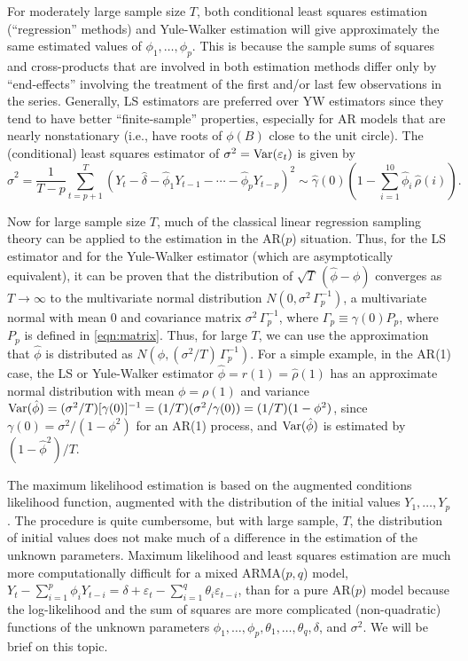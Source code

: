 For moderately large sample size $T$, both conditional least squares estimation (``regression'' methods) and Yule-Walker estimation will give approximately the same estimated values of $\phi_1, \ldots, \phi_p$. This is because the sample sums of squares and cross-products that are involved in both estimation methods differ only by ``end-effects'' involving the treatment of the first and/or last few observations in the series. Generally, LS estimators are preferred over YW estimators since they tend to have better ``finite-sample'' properties, especially for AR models that are nearly nonstationary (i.e., have roots of $\phi(B)$ close to the unit circle). The (conditional) least squares estimator of $\sigma^2 = \operatorname{Var}(\varepsilon_t)$ is given by
	\[
	\hat{\sigma}^2 =  \frac{1}{T - p}\sum_{t=p+1}^T (Y_t - \hat{\delta} - \hat{\phi}_1Y_{t-1} - \cdots - \hat{\phi}_pY_{t-p})^2 \sim \hat{\gamma}(0) \left( 1 - \sum_{i=1}^{10} \hat{\phi}_i \, \hat{\rho}(i) \right).
	\]


Now for large sample size $T$, much of the classical linear regression sampling theory can be applied to the estimation in the AR($p$) situation. Thus, for the LS estimator and for the Yule-Walker estimator (which are asymptotically equivalent), it can be proven that the distribution of $\sqrt{T}\,(\hat{\phi} - \phi)$ converges as $T \to \infty$ to the multivariate normal distribution $N(0,\sigma^2\,\Gamma_p^{-1})$, a multivariate normal with mean 0 and covariance matrix $\sigma^2\,\Gamma_p^{-1}$, where $\Gamma_p \equiv \gamma(0)P_p$, where $P_p$ is defined in \eqref{eqn:matrix}. Thus, for large $T$, we can use the approximation that $\hat{\phi}$ is distributed as $N(\phi,(\sigma^2/T)\,\Gamma_p^{-1})$. For a simple example, in the AR(1) case, the LS or Yule-Walker estimator $\hat{\phi} = r(1) = \hat{\rho}(1)$ has an approximate normal distribution with mean $\phi = \rho(1)$ and variance $\operatorname{Var}(\hat{\phi}) = (\sigma^2/T)[\gamma(0)]^{-1} = (1/T)(\sigma^2/\gamma(0)) = (1/T)(1 - \phi^2)$, since $\gamma(0) = \sigma^2/(1 - \phi^2)$ for an AR(1) process, and $\operatorname{Var}(\hat{\phi})$ is estimated by $(1 - \hat{\phi}^2)/T$.


The maximum likelihood estimation is based on the augmented conditions likelihood function, augmented with the distribution of the initial values $Y_1, \ldots, Y_p$. The procedure is quite cumbersome, but with large sample, $T$, the distribution of initial values does not make much of a difference in the estimation of the unknown parameters. Maximum likelihood and least squares estimation are much more computationally difficult for a mixed ARMA($p,q$) model, $Y_t - \sum_{i=1}^p \phi_i Y_{t-i} = \delta + \varepsilon_t - \sum_{i=1}^q\theta_i\varepsilon_{t-i}$, than for a pure AR($p$) model because the log-likelihood and the sum of squares are more complicated (non-quadratic) functions of the unknown parameters $\phi_1,\ldots,\phi_p,\theta_1,\ldots,\theta_q, \delta$, and $\sigma^2$. We will be brief on this topic.


